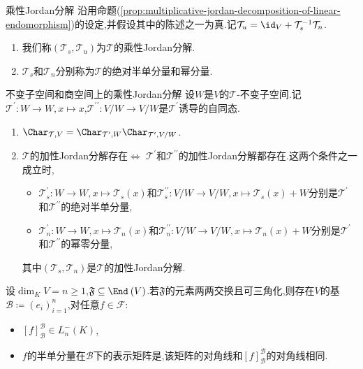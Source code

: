 \begin{definition}{乘性Jordan分解}{}
	沿用命题(\cref{prop:multiplicative-jordan-decomposition-of-linear-endomorphism})的设定,并假设其中的陈述之一为真.记$\mathcal{T}_{u}=\id_{V}+\mathcal{T}_{s}^{-1}\mathcal{T}_{n}$.
	\begin{enumerate}
		\item 我们称$\left(\mathcal{T}_{s},\mathcal{T}_{u}\right)$为$\mathcal{T}$的乘性Jordan分解.
		\item $\mathcal{T}_{s}$和$\mathcal{T}_{n}$分别称为$\mathcal{T}$的绝对半单分量和幂分量.
	\end{enumerate}
\end{definition}

\begin{proposition}{不变子空间和商空间上的乘性Jordan分解}{}
	设$W$是$V$的$\mathcal{T}$-不变子空间.记$\mathcal{T}^{\prime}:W\to W,x\mapsto x$,$\mathcal{T}^{\prime\prime}:V/W\to V/W$是$\mathcal{T}^{\prime}$诱导的自同态.
	\begin{enumerate}
		\item $\Char_{\mathcal{T},V}=\Char_{\mathcal{T}^{\prime},W}\Char_{\mathcal{T}^{\prime},V/W}$.
		\item $\mathcal{T}$的加性Jordan分解存在$\iff$ $\mathcal{T}^{\prime}$和$\mathcal{T}^{\prime\prime}$的加性Jordan分解都存在.这两个条件之一成立时,
		\begin{itemize}
			\item $\mathcal{T}_{s}^{\prime}:W\to W,x\mapsto\mathcal{T}_{s}\left(x\right)$和$\mathcal{T}_{s}^{\prime\prime}:V/W\to V/W,x\mapsto\mathcal{T}_{s}\left(x\right)+W$分别是$\mathcal{T}^{\prime}$和$\mathcal{T}^{\prime\prime}$的绝对半单分量,
			\item $\mathcal{T}_{n}^{\prime}:W\to W,x\mapsto\mathcal{T}_{n}\left(x\right)$和$\mathcal{T}_{n}^{\prime\prime}:V/W\to V/W,x\mapsto\mathcal{T}_{n}\left(x\right)+W$分别是$\mathcal{T}^{\prime}$和$\mathcal{T}^{\prime\prime}$的幂零分量,
		\end{itemize}
		其中$\left(\mathcal{T}_{s},\mathcal{T}_{n}\right)$是$\mathcal{T}$的加性Jordan分解.
	\end{enumerate}
\end{proposition}

\begin{proposition}{}{}
	设$\dim_{K}V=n\geq 1$,$\mathfrak{F}\subseteq\End_{}\left(V\right)$.若$\mathfrak{F}$的元素两两交换且可三角化,则存在$V$的基$\mathcal{B}\coloneq\left(e_{i}\right)_{i=1}^{n}$,对任意$ f\in\mathcal{F}$:
	\begin{itemize}
		\item $\left[f\right]_{\mathcal{B}}^{\mathcal{B}}\in L_{n}^{-}\left(K\right)$,
		\item $f$的半单分量在$\mathcal{B}$下的表示矩阵是,该矩阵的对角线和$\left[f\right]_{\mathcal{B}}^\mathcal{B}$的对角线相同.
	\end{itemize}
\end{proposition}